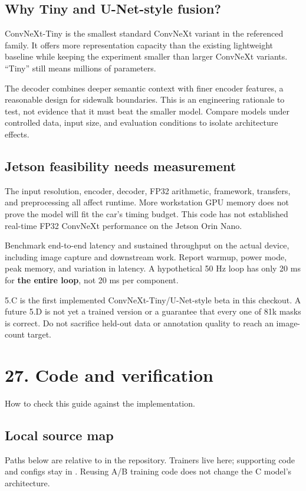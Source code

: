 \documentclass[11pt,letterpaper]{article}
\newcommand{\note}[1]{\par\vspace{3pt}\begingroup\setlength{\fboxsep}{8pt}%
 \colorbox{pale}{\parbox{\dimexpr\linewidth-2\fboxsep\relax}{#1}}\endgroup\par\vspace{3pt}}
\newcommand{\guidepage}[2]{\clearpage\pdfbookmark[0]{#1}{guide-\thepage}\section*{#1}{\sffamily\color{muted}#2}\par\vspace{5pt}}
\begin{document}
\subsection*{Why Tiny and U-Net-style fusion?}
ConvNeXt-Tiny is the smallest standard ConvNeXt variant in the referenced family. It offers more representation capacity than the existing lightweight baseline while keeping the experiment smaller than larger ConvNeXt variants. ``Tiny'' still means millions of parameters.

The decoder combines deeper semantic context with finer encoder features, a reasonable design for sidewalk boundaries. This is an engineering rationale to test, not evidence that it must beat the smaller model. Compare models under controlled data, input size, and evaluation conditions to isolate architecture effects.

\subsection*{Jetson feasibility needs measurement}
The input resolution, encoder, decoder, FP32 arithmetic, framework, transfers, and preprocessing all affect runtime. More workstation GPU memory does not prove the model will fit the car's timing budget. This code has not established real-time FP32 ConvNeXt performance on the Jetson Orin Nano.

Benchmark end-to-end latency and sustained throughput on the actual device, including image capture and downstream work. Report warmup, power mode, peak memory, and variation in latency. A hypothetical 50 Hz loop has only 20 ms for \textbf{the entire loop}, not 20 ms per component.

\note{5.C is the first implemented ConvNeXt-Tiny/U-Net-style beta in this checkout. A future 5.D is not yet a trained version or a guarantee that every one of 81k masks is correct. Do not sacrifice held-out data or annotation quality to reach an image-count target.}

\guidepage{27. Code and verification}{How to check this guide against the implementation.}
\subsection*{Local source map}
Paths below are relative to  in the repository. Trainers live here; supporting code and configs stay in . Reusing A/B training code does not change the C model's architecture.
\end{document}
